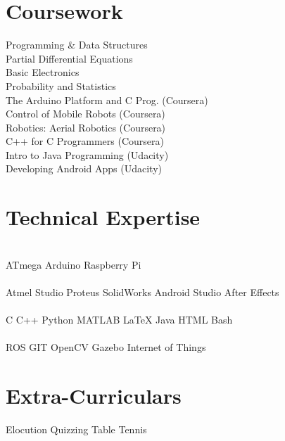 \documentclass[letterpaper]{aman}
\begin{document}
\begin{minipage}[t]{0.39\textwidth}

\section{Coursework}
Programming \& Data Structures\\
Partial Differential Equations \\
Basic Electronics \\
Probability and Statistics \\
The Arduino Platform and C Prog. (Coursera)\\
Control of Mobile Robots (Coursera)\\
Robotics: Aerial Robotics (Coursera)\\
C++ for C Programmers (Coursera) \\
Intro to Java Programming (Udacity)\\
Developing Android Apps (Udacity)\\
\sectionsep



\section{Technical Expertise}
\\
ATmega \textbullet{} Arduino \textbullet{} Raspberry Pi\\
{}\\
Atmel Studio \textbullet Proteus \textbullet SolidWorks \textbullet Android Studio \textbullet After Effects \\
{}\\
 C  \textbullet{} C++ \textbullet{} Python \textbullet{} MATLAB  \textbullet{} \LaTeX \textbullet{}  Java \textbullet{} HTML \textbullet Bash\\
{}\\
ROS \textbullet{} GIT \textbullet OpenCV \textbullet Gazebo \textbullet Internet of Things\\
\sectionsep



\section{Extra-Curriculars}  
Elocution \textbullet{} Quizzing \textbullet{} Table Tennis \\
\sectionsep


\end{minipage} 
\end{document}
